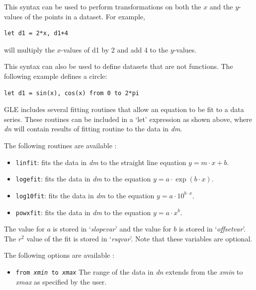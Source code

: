 \begin{commanddescription}
This syntax can be used to perform transformations on both the $x$ and the $y$-values of the points in a dataset. For example,

\begin{Verbatim}
let d1 = 2*x, d1+4
\end{Verbatim}

will multiply the $x$-values of d1 by 2 and add 4 to the $y$-values.

This syntax can also be used to define datasets that are not functions. The following example defines a circle:

\begin{Verbatim}
let d1 = sin(x), cos(x) from 0 to 2*pi
\end{Verbatim}

\item[{\sf let {\it dn} = [routine] {\it dm} [options] [{\it slopevar}] [{\it offsetvar}] [{\it rsqvar}]}]

GLE includes several fitting routines that allow an equation to be fit to a data series. These routines can be included in a `let' expression as shown above, where {\it dn} will contain results of fitting {\sf routine} to the data in {\it dm}.

The following routines are available :
\begin{itemize}
\item \texttt{linfit}: fits the data in \textit{dm} to the straight line equation $y = m \cdot x + b$.
\item \texttt{logefit}: fits the data in \textit{dm} to the equation $y = a \cdot \exp(b \cdot x)$.
\item \texttt{log10fit}: fits the data in \textit{dm} to the equation $y = a \cdot 10^{b \cdot x}$.
\item \texttt{powxfit}: fits the data in \textit{dm} to the equation $y = a \cdot x^b$.
\end{itemize}

The value for $a$ is stored in `{\it slopevar}' and the value for $b$ is stored in `{\it offsetvar}'. The $r^2$ value of the fit is stored in `{\it rsqvar}'. Note that these variables are optional.

The following options are available :
\begin{itemize}
\item \texttt{from {\it xmin} to {\it xmax}} The range of the data in \textit{dn} extends from the \textit{xmin} to \textit{xmax} as specified by the user.


\end{itemize}
\end{commanddescription}
